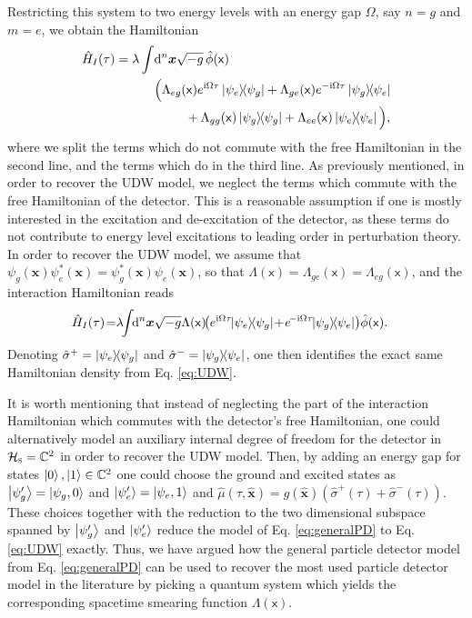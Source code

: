 \documentclass[prd,twocolumn,superscriptaddress,floatfix,amsmath,amssymb,amsfonts,longbibliography,nofootinbib]{revtex4-1}
\newcommand{\mf}{\mathsf}%
\newcommand{\ii}{\mathrm{i}}
\begin{document}
Restricting this system to two energy levels with an energy gap $\Omega$, say $n = g$ and $m = e$, we obtain the Hamiltonian
\begin{align}
    \hat{H}_I(\tau) = \lambda \int & \dd^n \bm x \sqrt{-g}\,\hat{\phi}(\mf x)\,\\
    &\Big(\Lambda_{eg}(\mf x)e^{\ii\Omega\tau}\ket{\psi_e}\!\!\bra{\psi_g} +\Lambda_{ge}(\mf x)e^{-\ii\Omega\tau} \ket{\psi_g}\!\!\bra{\psi_e}\nonumber\\
    &\:\:\:\:\:\:\:\:\:\:\:+\Lambda_{gg}(\mf x)\ket{\psi_g}\!\!\bra{\psi_g}+\Lambda_{ee}(\mf x)\ket{\psi_e}\!\!\bra{\psi_e}\Big),\nonumber
\end{align}
where we split the terms which do not commute with the free Hamiltonian in the second line, and the terms which do in the third line. As previously mentioned, in order to recover the UDW model, we neglect the terms which commute with the free Hamiltonian of the detector. This is a reasonable assumption if one is mostly interested in the excitation and de-excitation of the detector, as these terms do not contribute to energy level excitations to leading order in perturbation theory. In order to recover the UDW model, we assume that \mbox{$\psi_g(\bm x)\psi^*_e(\bm x) = \psi^*_g(\bm x)\psi_e(\bm x)$}, so that \mbox{$\Lambda(\mf x) = \Lambda_{ge}(\mf x) = \Lambda_{eg}(\mf x)$}, and the interaction Hamiltonian reads
\begin{align}
    \hat{H}_I(\tau) \!=& \lambda\!\! \int\!\! \dd^n \bm x \sqrt{-g} \Lambda(\mf x)\!\!\left(e^{\ii\Omega\tau}\!\!\:\!\ket{\psi_e}\!\!\bra{\psi_g} \!+\!e^{\!-\ii\Omega\tau} \!\:\!\!\ket{\psi_g}\!\!\bra{\psi_e}\right)\!\hat{\phi}(\mf x).
\end{align}
Denoting $\hat{\sigma}^+ = \ket{\psi_e}\!\!\bra{\psi_g}$ and $\hat{\sigma}^- = \ket{\psi_g}\!\!\bra{\psi_e}$, one then identifies the exact same Hamiltonian density from Eq. \eqref{eq:UDW}.

It is worth mentioning that instead of neglecting the part of the interaction Hamiltonian which commutes with the detector's free Hamiltonian, one could alternatively model an auxiliary internal degree of freedom for the detector in $\mathcal{H}_\textsc{s} = \mathbb{C}^2$ in order to recover the UDW model. Then, by adding an energy gap for states $\ket{0},\ket{1}\in\mathbb{C}^2$ one could choose the ground and excited states as $\ket{\psi_g'} = \ket{\psi_g,0}$ and $\ket{\psi_e'} = \ket{\psi_e,1}$ and \mbox{$\hat{\mu}(\tau,\hat{\bm x}) = g(\hat{\bm x})(\hat{\sigma}^+(\tau) + \hat{\sigma}^-(\tau))$}. These choices together with the reduction to the two dimensional subspace spanned by $\ket{\psi_g'}$ and $\ket{\psi_e'}$ reduce the model of Eq. \eqref{eq:generalPD} to Eq. \eqref{eq:UDW} exactly. Thus, we have argued how the general particle detector model from Eq. \eqref{eq:generalPD} can be used to recover the most used particle detector model in the literature by picking a quantum system which yields the corresponding spacetime smearing function $\Lambda(\mf x)$.
\end{document}
